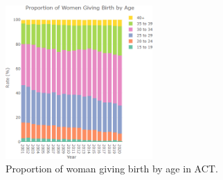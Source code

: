 \begin{figure}
  \centering
  \includegraphics[width=0.50\textwidth]{subsections/age_mothers/age_group.png}
  \caption{Proportion of woman giving birth by age in ACT.}
  \label{fig:age1}
\end{figure}
